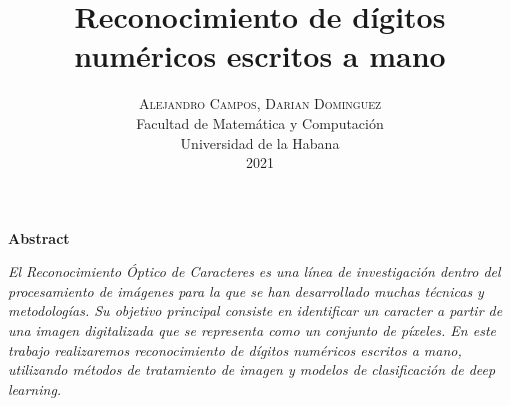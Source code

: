 \documentclass[twoside]{article}
\title{\vspace{-0.5cm}\fontsize{20pt}{10pt}\selectfont\textbf{Reconocimiento de d\'igitos num\'ericos escritos a mano}}
\author{
\large
\textsc{\vspace{-2cm} Alejandro Campos, Darian Dominguez}\\[3.5cm]
\normalsize Facultad de Matem\'atica y Computaci\'on \\
\normalsize Universidad de la Habana \\
\normalsize 2021 \\[1cm]
\vspace{-5mm}
}
\date{}
\begin{document}
\maketitle

\thispagestyle{fancy} 

\begin{center}
\textbf{Abstract}
\end{center}
\noindent \textit{ El Reconocimiento \'Optico de Caracteres es una l\'inea de investigaci\'on dentro del procesamiento de im\'agenes para la que se han desarrollado muchas t\'ecnicas y metodolog\'ias. Su objetivo principal consiste en identificar un caracter a partir de una imagen digitalizada que se representa como un conjunto de p\'ixeles. En este trabajo realizaremos reconocimiento de d\'igitos num\'ericos escritos a mano, utilizando m\'etodos de tratamiento de imagen y modelos de clasificaci\'on de deep learning.}\\[0.5cm]
\end{document}
